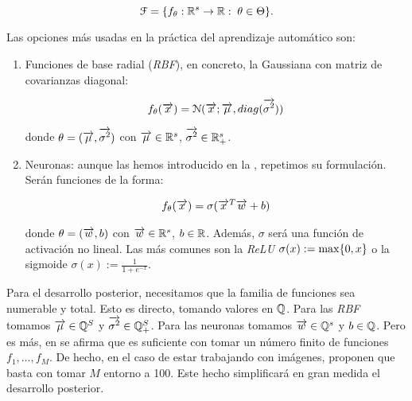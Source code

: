 \begin{equation}
	\mathcal{F} = \{  f_{\theta}: \mathbb{R}^s \to \mathbb{R}: \; \theta \in \Theta \}.
\end{equation}

Las opciones más usadas en la práctica del aprendizaje automático son:

\begin{enumerate}
    \item Funciones de base radial (\textit{RBF}), en concreto, la Gaussiana con matriz de covarianzas diagonal:

	      \begin{equation}
		      f_\theta(\overrightarrow{x}) = \mathcal{N}(\overrightarrow{x}; \overrightarrow{\mu}, diag(\overrightarrow{\sigma^2}))
	      \end{equation}

          donde $\theta = (\overrightarrow{\mu}, \overrightarrow{\sigma^2})$ con $\overrightarrow{\mu} \in \mathbb{R}^s$, $\overrightarrow{\sigma^2} \in \mathbb{R}^s_+$.

      \item Neuronas: aunque las hemos introducido en la  , repetimos su formulación. Serán funciones de la forma:

        \begin{equation}
        \begin{split}
            & f_\theta(\overrightarrow{x}) = \sigma(\overrightarrow{x}^T \overrightarrow{w} + b) \\
        \end{split}
        \end{equation}

        donde $\theta = (\overrightarrow{w}, b)$ con $\overrightarrow{w} \in \mathbb{R}^s$, $b \in \mathbb{R}$. Además, $\sigma$ será una función de activación no lineal. Las más comunes son la \textit{ReLU} $\sigma(x) := \max \{ 0, x \}$ o la sigmoide $\sigma(x) := \frac{1}{1 + e^{-x}}$.
\end{enumerate}

Para el desarrollo posterior, necesitamos que la familia de funciones sea numerable y total. Esto es directo, tomando valores en $ \mathbb{Q}$. Para las \textit{RBF} tomamos $\overrightarrow{\mu} \in \mathbb{Q}^S$ y $\overrightarrow{\sigma^2} \in \mathbb{Q}^S_+$. Para las neuronas tomamos $\overrightarrow{w} \in \mathbb{Q}^s$ y $b \in \mathbb{Q}$.  Pero es más, en \cite{matematicas:principal} se afirma que es suficiente con tomar un número finito de funciones ${f_1, \ldots, f_M}$. De hecho, en el caso de estar trabajando con imágenes, proponen que basta con tomar $M$ entorno a 100. Este hecho simplificará en gran medida el desarrollo posterior.

